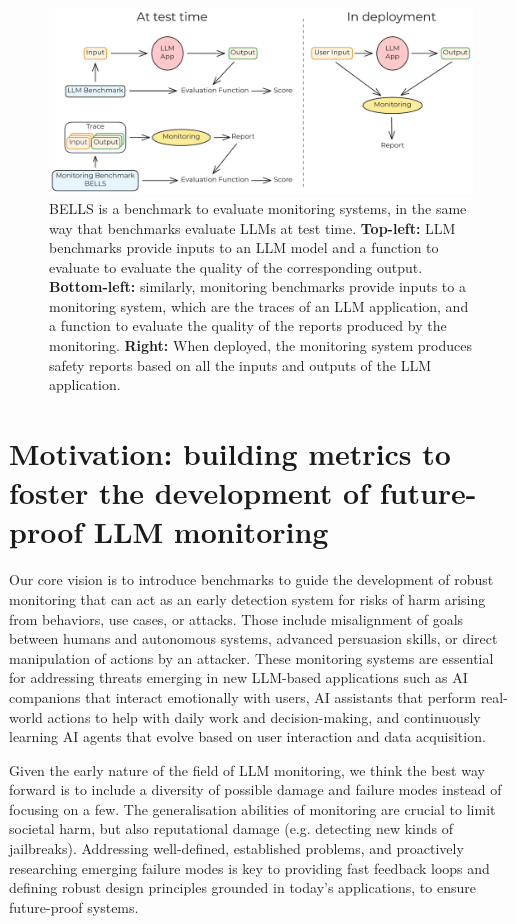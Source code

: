 \documentclass{article}
\begin{document}
\begin{figure}[h]
	\centering
	\includegraphics[width=1.0\textwidth]{images/what-is-monitoring.pdf}
	\caption{
		BELLS is a benchmark to evaluate monitoring systems, in the same way
		that benchmarks evaluate LLMs at test time.
		\textbf{Top-left:} LLM benchmarks provide inputs to an LLM model
		and a function to evaluate to evaluate the quality of the corresponding output.
		\textbf{Bottom-left:} similarly, monitoring benchmarks provide inputs to
		a monitoring system, which are the traces of an LLM application, and a
		function to evaluate the quality of the reports produced by the monitoring.
		\textbf{Right:} When deployed, the monitoring system produces safety reports
		based on all the inputs and outputs of the LLM application.
	}
	\label{fig-monitoring}
\end{figure}

\section{Motivation: building metrics to foster the development of future-proof LLM monitoring}

Our core vision is to introduce benchmarks to guide the development of robust monitoring that can act as an early detection system for risks of harm arising from behaviors, use cases, or attacks. Those include misalignment of goals between humans and autonomous systems, advanced persuasion skills, or direct manipulation of actions by an attacker. These monitoring systems are essential for addressing threats emerging in new LLM-based applications such as AI companions that interact emotionally with users, AI assistants that perform real-world actions to help with daily work and decision-making, and continuously learning AI agents that evolve based on user interaction and data acquisition.


Given the early nature of the field of LLM monitoring, we think the best
way forward is to include a diversity of possible damage and failure
modes instead of focusing on a few. The generalisation abilities of
monitoring are crucial to limit societal harm, but also reputational
damage (e.g. detecting new kinds of jailbreaks). Addressing
well-defined, established problems, and proactively researching emerging
failure modes is key to providing fast feedback loops and defining
robust design principles grounded in today’s applications, to ensure
future-proof systems.
\end{document}
